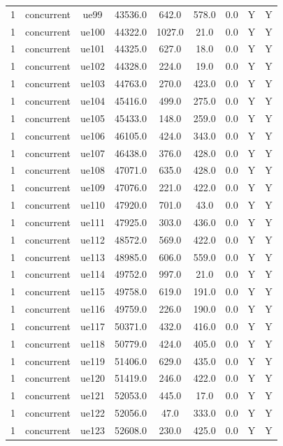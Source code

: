 \begin{table}[ht]
\begin{tabular}{|c|c|c|c|c|c|c|c|c|}
1 & concurrent & ue99 & 43536.0 & 642.0 & 578.0 & 0.0 & Y & Y \\
1 & concurrent & ue100 & 44322.0 & 1027.0 & 21.0 & 0.0 & Y & Y \\
1 & concurrent & ue101 & 44325.0 & 627.0 & 18.0 & 0.0 & Y & Y \\
1 & concurrent & ue102 & 44328.0 & 224.0 & 19.0 & 0.0 & Y & Y \\
1 & concurrent & ue103 & 44763.0 & 270.0 & 423.0 & 0.0 & Y & Y \\
1 & concurrent & ue104 & 45416.0 & 499.0 & 275.0 & 0.0 & Y & Y \\
1 & concurrent & ue105 & 45433.0 & 148.0 & 259.0 & 0.0 & Y & Y \\
1 & concurrent & ue106 & 46105.0 & 424.0 & 343.0 & 0.0 & Y & Y \\
1 & concurrent & ue107 & 46438.0 & 376.0 & 428.0 & 0.0 & Y & Y \\
1 & concurrent & ue108 & 47071.0 & 635.0 & 428.0 & 0.0 & Y & Y \\
1 & concurrent & ue109 & 47076.0 & 221.0 & 422.0 & 0.0 & Y & Y \\
1 & concurrent & ue110 & 47920.0 & 701.0 & 43.0 & 0.0 & Y & Y \\
1 & concurrent & ue111 & 47925.0 & 303.0 & 436.0 & 0.0 & Y & Y \\
1 & concurrent & ue112 & 48572.0 & 569.0 & 422.0 & 0.0 & Y & Y \\
1 & concurrent & ue113 & 48985.0 & 606.0 & 559.0 & 0.0 & Y & Y \\
1 & concurrent & ue114 & 49752.0 & 997.0 & 21.0 & 0.0 & Y & Y \\
1 & concurrent & ue115 & 49758.0 & 619.0 & 191.0 & 0.0 & Y & Y \\
1 & concurrent & ue116 & 49759.0 & 226.0 & 190.0 & 0.0 & Y & Y \\
1 & concurrent & ue117 & 50371.0 & 432.0 & 416.0 & 0.0 & Y & Y \\
1 & concurrent & ue118 & 50779.0 & 424.0 & 405.0 & 0.0 & Y & Y \\
1 & concurrent & ue119 & 51406.0 & 629.0 & 435.0 & 0.0 & Y & Y \\
1 & concurrent & ue120 & 51419.0 & 246.0 & 422.0 & 0.0 & Y & Y \\
1 & concurrent & ue121 & 52053.0 & 445.0 & 17.0 & 0.0 & Y & Y \\
1 & concurrent & ue122 & 52056.0 & 47.0 & 333.0 & 0.0 & Y & Y \\
1 & concurrent & ue123 & 52608.0 & 230.0 & 425.0 & 0.0 & Y & Y \\

\end{tabular}
\end{table}
